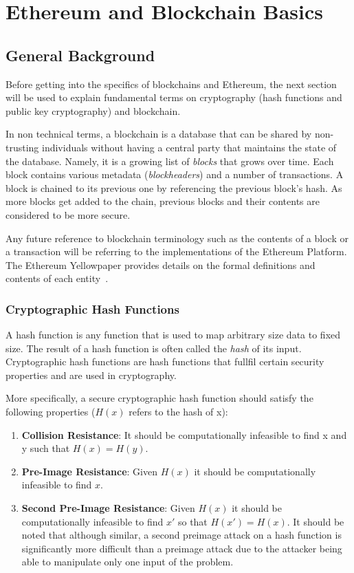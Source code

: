 \chapter{Ethereum and Blockchain Basics}

\section{General Background}
Before getting into the specifics of blockchains and Ethereum, the next section will be used to explain fundamental terms on cryptography (hash functions and public key cryptography) and blockchain.

In non technical terms, a blockchain is a database that can be shared by non-trusting individuals without having a central party that maintains the state of the database. Namely, it is a growing list of \textit{blocks} that grows over time. Each block contains various metadata (\textit{blockheaders}) and a number of transactions. A block is chained to its previous one by referencing the previous block's hash. As more blocks get added to the chain, previous blocks and their contents are considered to be more secure.

Any future reference to blockchain terminology such as the contents of a block or a transaction will be referring to the implementations of the Ethereum Platform. The Ethereum Yellowpaper provides details on the formal definitions and contents of each entity~\cite{ethereum}.

\subsection{Cryptographic Hash Functions}
A hash function is any function that is used to map arbitrary size data to fixed size. The result of a hash function is often called the \textit{hash} of its input. Cryptographic hash functions are hash functions that fullfil certain security properties and are used in cryptography. %

More specifically, a secure cryptographic hash function should satisfy the following properties (\(H(x)\) refers to the hash of x):
\begin{enumerate}
   \item \textbf{Collision Resistance}: It should be computationally infeasible to find x and y such that \(H(x) = H(y)\). 
   \item \textbf{Pre-Image Resistance}: Given \(H(x)\) it should be computationally infeasible to find \(x\).
   \item \textbf{Second Pre-Image Resistance}: Given \(H(x)\) it should be computationally infeasible to find \(x'\) so that \(H(x') = H(x)\). It should be noted that although similar, a second preimage attack on a hash function is significantly more difficult than a preimage attack due to the attacker being able to manipulate only one input of the problem. 
\end{enumerate}

